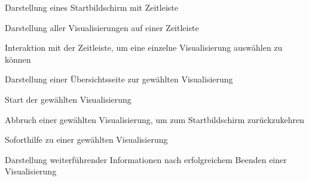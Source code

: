 \documentclass{article}
\begin{document}
\begin{FA}[start=100]
  \item Darstellung eines Startbildschirm mit Zeitleiste
  \item Darstellung aller Visualisierungen auf einer Zeitleiste
  \item Interaktion mit der Zeitleiste, um eine einzelne Visualisierung auswählen zu können
  \item Darstellung einer Übersichtsseite zur gewählten Visualisierung
  \item Start der gewählten Visualisierung
  \item Abbruch einer gewählten Visualisierung, um zum Startbildschirm zurückzukehren
  \item Soforthilfe zu einer gewählten Visualisierung
  \item Darstellung weiterführender Informationen nach erfolgreichem Beenden einer Visualisierung 
\end{FA}
\end{document}
